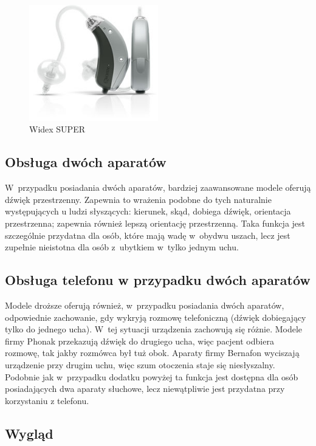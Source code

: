 \documentclass[journal,11pt]{IEEEtran}
\begin{document}
\begin{figure}
    \includegraphics[width=0.5\textwidth]{widex}
    \caption{Widex SUPER}
    \label{fig:widex}
\end{figure}

\subsection{Obsługa dwóch aparatów}

W~przypadku posiadania dwóch aparatów, bardziej zaawansowane modele oferują
dźwięk przestrzenny. Zapewnia to wrażenia podobne do tych naturalnie
występujących u ludzi słyszących: kierunek, skąd, dobiega dźwięk, orientacja
przestrzenna; zapewnia również lepszą orientację przestrzenną. Taka funkcja
jest szczególnie przydatna dla osób, które mają wadę w~obydwu uszach, lecz jest
zupełnie nieistotna dla osób z~ubytkiem w~tylko jednym uchu.

\subsection{Obsługa telefonu w przypadku dwóch aparatów}

Modele droższe oferują również, w~przypadku posiadania dwóch aparatów,
odpowiednie zachowanie, gdy wykryją rozmowę telefoniczną (dźwięk dobiegający
tylko do jednego ucha). W~tej sytuacji urządzenia zachowują się różnie. Modele
firmy Phonak przekazują dźwięk do drugiego ucha, więc pacjent odbiera rozmowę,
tak jakby rozmówca był tuż obok. Aparaty firmy Bernafon wyciszają urządzenie
przy drugim uchu, więc szum otoczenia staje się niesłyszalny. Podobnie jak
w~przypadku dodatku powyżej ta funkcja jest dostępna dla osób posiadających dwa
aparaty słuchowe, lecz niewątpliwie jest przydatna przy korzystaniu z
telefonu.

\subsection{Wygląd}
\end{document}
